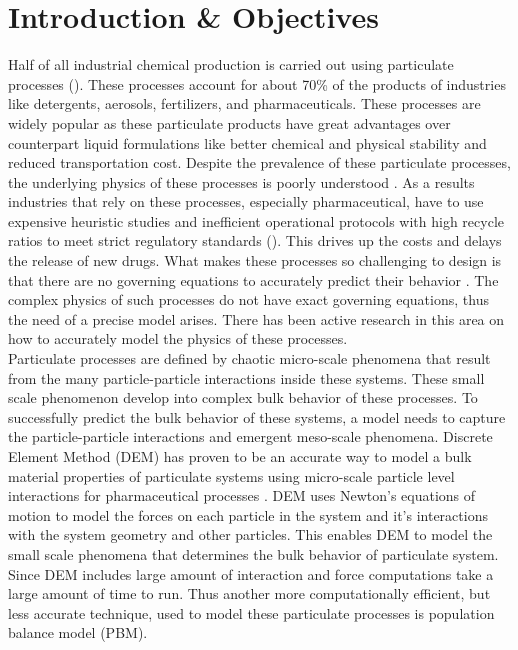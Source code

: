 \documentclass[preprint,11pt,authoryear]{elsarticle}
\begin{document}
\section{Introduction \& Objectives} 
Half of all industrial chemical production is carried out using particulate processes 
(\cite{seville1997}). These processes account for about 70\% of the products 
of industries like detergents, aerosols, fertilizers, and pharmaceuticals\citep{Litster2016}. 
These processes are widely popular as these particulate products have great advantages over 
counterpart liquid formulations like better chemical and physical stability and reduced 
transportation cost. Despite the prevalence of these particulate processes, the underlying 
physics of these processes is poorly understood \citep{Rogers2013}. As a results industries 
that rely on these processes, especially pharmaceutical, have to use expensive 
heuristic studies and inefficient operational protocols with high recycle ratios to meet strict 
regulatory standards (\cite{Ramachandran2009}). This drives up the costs and delays the release of 
new drugs. What makes these processes so challenging to design is that there are no governing 
equations to accurately predict their behavior \citep{sen2013}. The complex physics of such 
processes do not have exact governing equations, thus the need of a precise model arises. There 
has been active research in this area on how to accurately model the  physics of these processes.\\
Particulate processes are defined by chaotic micro-scale phenomena that result from the many 
particle-particle interactions inside these systems. These small scale phenomenon develop into 
complex bulk behavior of these processes. To successfully predict the bulk behavior of these 
systems, a model needs to capture the particle-particle interactions and emergent meso-scale phenomena. 
Discrete Element Method (DEM)\citep{Cundall1979} has proven to be an accurate way 
to  model a bulk material properties of particulate systems using micro-scale particle level 
interactions for pharmaceutical processes \citep{Hancock2011}. DEM uses Newton's equations of 
motion to model the forces on each particle in the system and it's interactions with the system 
geometry and other particles. This enables DEM to model the small scale phenomena that 
determines the bulk behavior of particulate system. Since DEM includes large amount of interaction 
and force computations take a large amount of time to run. Thus another more computationally 
efficient, but less accurate technique, used to model these particulate processes is population 
balance model (PBM).
\end{document}
